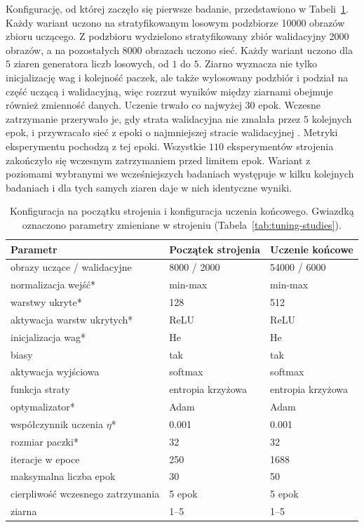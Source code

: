 Konfigurację, od której zaczęło się pierwsze badanie, przedstawiono w Tabeli~\ref{tab:configs}. Każdy wariant uczono na stratyfikowanym losowym podzbiorze \num{10000} obrazów zbioru uczącego. Z podzbioru wydzielono stratyfikowany zbiór walidacyjny \num{2000} obrazów, a na pozostałych \num{8000} obrazach uczono sieć. Każdy wariant uczono dla $5$ ziaren generatora liczb losowych, od $1$ do $5$. Ziarno wyznacza nie tylko inicjalizację wag i kolejność paczek, ale także wylosowany podzbiór i podział na część uczącą i walidacyjną, więc rozrzut wyników między ziarnami obejmuje również zmienność danych. Uczenie trwało co najwyżej $30$ epok. Wczesne zatrzymanie przerywało je, gdy strata walidacyjna nie zmalała przez $5$ kolejnych epok, i przywracało sieć z epoki o najmniejszej stracie walidacyjnej \cite[rozdz.~7.8]{goodfellow2016}. Metryki eksperymentu pochodzą z tej epoki. Wszystkie $110$ eksperymentów strojenia zakończyło się wczesnym zatrzymaniem przed limitem epok. Wariant z poziomami wybranymi we wcześniejszych badaniach występuje w kilku kolejnych badaniach i dla tych samych ziaren daje w nich identyczne wyniki.

\begin{table}[H]
    \centering
    \caption{Konfiguracja na początku strojenia i konfiguracja uczenia końcowego. Gwiazdką oznaczono parametry zmieniane w strojeniu (Tabela~\ref{tab:tuning-studies}).}
    \label{tab:configs}
    \begin{tabular}{lll}
        \toprule
        Parametr & Początek strojenia & Uczenie końcowe \\
        \midrule
        obrazy uczące / walidacyjne & \num{8000} / \num{2000} & \num{54000} / \num{6000} \\
        normalizacja wejść* & min-max & min-max \\
        warstwy ukryte* & 128 & 512 \\
        aktywacja warstw ukrytych* & ReLU & ReLU \\
        inicjalizacja wag* & He & He \\
        biasy & tak & tak \\
        aktywacja wyjściowa & softmax & softmax \\
        funkcja straty & entropia krzyżowa & entropia krzyżowa \\
        optymalizator* & Adam & Adam \\
        współczynnik uczenia $\eta$* & \num{0.001} & \num{0.001} \\
        rozmiar paczki* & 32 & 32 \\
        iteracje w epoce & \num{250} & \num{1688} \\
        maksymalna liczba epok & 30 & 50 \\
        cierpliwość wczesnego zatrzymania & 5 epok & 5 epok \\
        ziarna & \numrange{1}{5} & \numrange{1}{5} \\
        \bottomrule
    \end{tabular}
\end{table}

